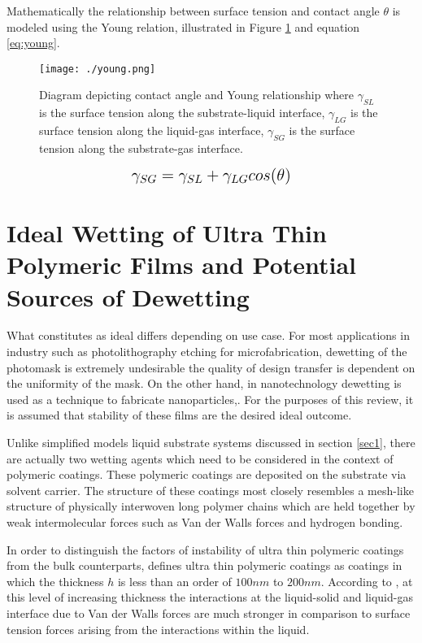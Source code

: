 \documentclass{article}
\begin{document}
Mathematically the relationship between surface tension and contact angle $\theta$ is modeled using the Young relation, illustrated in Figure \ref{fig:young} and equation \ref{eq:young}.

\begin{figure}[H]
\caption{Diagram depicting contact angle and Young relationship where $\gamma_{SL}$ is the surface tension along the substrate-liquid interface, $\gamma_{LG}$ is the surface tension along the liquid-gas interface, $\gamma_{SG}$ is the surface tension along the substrate-gas interface.}
\centering
\texttt{[image: ./young.png]}
\label{fig:young}
\end{figure}

\begin{equation} \label{eq:young}%
\mbox{\Large\( %
\gamma_{SG} = \gamma_{SL} + \gamma_{LG} cos(\theta) %
\)} %
\end{equation}

\section{Ideal Wetting of Ultra Thin Polymeric Films and Potential Sources of Dewetting}

What constitutes as ideal differs depending on use case. For most applications in industry such as photolithography etching for microfabrication, dewetting of the photomask is extremely undesirable the quality of design transfer is dependent on the uniformity of the mask. On the other hand, in nanotechnology dewetting is used as a technique to fabricate nanoparticles,\textcite{gentili2012applications}. For the purposes of this review, it is assumed that stability of these films are the desired ideal outcome.

Unlike simplified models liquid substrate systems discussed in section \ref{sec1}, there are actually two wetting agents which need to be considered in the context of polymeric coatings. These polymeric coatings are deposited on the substrate via solvent carrier. The structure of these coatings most closely resembles a mesh-like structure of physically interwoven long polymer chains which are held together by weak intermolecular forces such as Van der Walls forces and hydrogen bonding.

In order to distinguish the factors of instability of ultra thin polymeric coatings from the bulk counterparts, \textcite{ashley2005wetting} defines ultra thin polymeric coatings as coatings in which the thickness $h$ is less than an order of $100 nm$ to $ 200 nm$. According to \textcite{pahlavan2018thin}, at this level of increasing thickness the interactions at the liquid-solid and liquid-gas interface due to Van der Walls forces are much stronger in comparison to surface tension forces arising from the interactions within the liquid.
\end{document}
